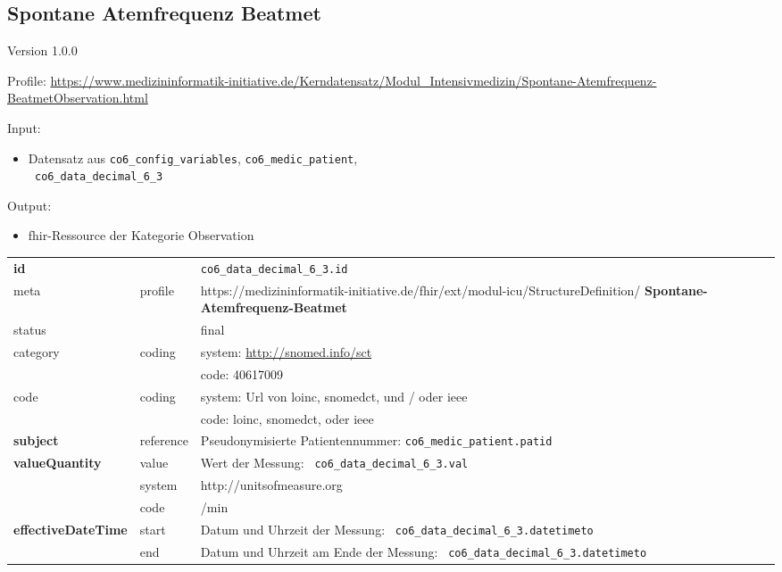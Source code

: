\subsection{Spontane Atemfrequenz Beatmet} 
\noindent Version 1.0.0

\noindent Profile: \url{https://www.medizininformatik-initiative.de/Kerndatensatz/Modul_Intensivmedizin/Spontane-Atemfrequenz-BeatmetObservation.html}

\noindent Input:
\begin{itemize}
	\item Datensatz aus \texttt{co6\_config\_variables}, \texttt{co6\_medic\_patient}, \\ \texttt{
co6\_data\_decimal\_6\_3}
\end{itemize}
Output:
\begin{itemize}
        \item \ac{fhir}-Ressource der Kategorie \glqq Observation\grqq{}
\end{itemize}
\begin{longtable}{|l|l|p{7.5cm}|}
        \hline
        \rowcolor{lightgray} \multicolumn{3}{|l|}{Data Mapping (inhaltlich)} \\ \hline
        \textbf{id} &  & \texttt{co6\_data\_decimal\_6\_3.id} \\ \hline
	meta & profile & https://medizininformatik-initiative.de/fhir/ext/modul-icu/StructureDefinition/\textbf{
Spontane-Atemfrequenz-Beatmet} \\ \hline 
	status &  & final   \\ \hline 
	category & coding & system: \url{http://snomed.info/sct} \\
\cline{3-3}
	& & code: 40617009 \\ \hline
	code & coding & system: Url von \ac{loinc}, \ac{snomedct}, und / oder \ac{ieee} \\ 
	\cline{3-3} 
	 &  & code: \ac{loinc}, \ac{snomedct}, oder \ac{ieee} \\ \hline
	 \textbf{subject}  & reference & Pseudonymisierte Patientennummer: \texttt{co6\_medic\_patient.patid} \\ \hline
	 \textbf{valueQuantity}  & value & Wert der Messung: \texttt{
co6\_data\_decimal\_6\_3.val} \\
        \cline{2-3}
         & system & http://unitsofmeasure.org \\
         \cline{2-3}
         & code & /min \\ \hline
     \textbf{effectiveDateTime}  & start & Datum und Uhrzeit der Messung: \texttt{
co6\_data\_decimal\_6\_3.datetimeto} \\
    \cline{2-3}
     & end & Datum und Uhrzeit am Ende der Messung: \texttt{
co6\_data\_decimal\_6\_3.datetimeto} \\ \hline
\end{longtable}


